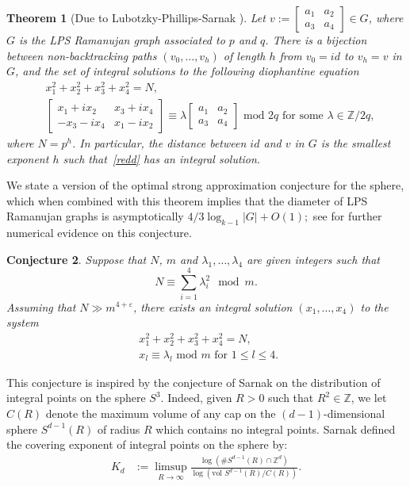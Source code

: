 \documentclass[11pt]{amsart}
\theoremstyle{plain}
\theoremstyle{plain}
\newtheorem{theorem}{Theorem}[section]
\newtheorem{conjecture}[theorem]{Conjecture}
\theoremstyle{remark}
\theoremstyle{definition}
\begin{document}
\begin{theorem}[Due to Lubotzky-Phillips-Sarnak \cite{Lubotzky1988}]\label{reductionthm} 
Let $v:=\begin{bmatrix} a_1 &a_2 \\ a_3 &a_4   \end{bmatrix} \in G$, where $G$ is the LPS Ramanujan graph associated to $p$ and $q$. There is a bijection between  non-backtracking  paths $(v_0,\dots,v_h)$  of length $h$ from $v_0=id$ to $v_h=v$  in $G$, and the set of integral solutions to the following diophantine equation 
\begin{equation}\label{redd}
\begin{split}
&x_1^2+x_2^2+x_3^2+x_4^2=N,
\\
&\begin{bmatrix}x_1+ix_2 & x_3+ix_4 \\ -x_3-ix_4 &x_1-ix_2 \end{bmatrix}  \equiv  \lambda \begin{bmatrix} a_1 &a_2 \\ a_3 &a_4   \end{bmatrix}  \text{ mod } 2q \text{ for some }\lambda \in \mathbb{Z}/2q,
\end{split}
\end{equation} 
   where $N=p^h$.
In particular, the distance between $id$ and $v$ in $G$ is the smallest exponent $h$ such that~\eqref{redd} has an integral solution. 
\end{theorem}
We state a version of the optimal strong approximation conjecture for the sphere, which when combined with this theorem implies that the diameter of LPS Ramanujan graphs is asymptotically $4/3 \log_{k-1}|G|+O(1);$ see \cite{Cayley, Complexity} for further numerical evidence on this conjecture.
\begin{conjecture}\label{mainconjecture}
Suppose that $N$, $m$ and $\lambda_1, \dots, \lambda_4$ are given integers such that 
$$
N\equiv \sum_{i=1}^4 \lambda_i^2 \mod m.
$$ 
Assuming that $N\gg m^{4+\varepsilon}$, there exists an integral solution $(x_1,\dots,x_4)$ to the system
\begin{equation*}\label{redd}
\begin{split}
&x_1^2+x_2^2+x_3^2+x_4^2=N,
\\
&x_l\equiv \lambda_l \text{ mod } m \text{ for  $1\leq l \leq 4$. }
\end{split}
\end{equation*} 
\end{conjecture}
 This conjecture is inspired by the conjecture of Sarnak on the distribution of integral points on the sphere $S^3$. Indeed, given $R>0$ such that $R^2\in \mathbb{Z}$, we let $C(R)$ denote the maximum volume  of any cap on  the $(d-1)$-dimensional sphere $S^{d-1}(R)$ of radius $R$ which contains no integral points. Sarnak defined  \cite{Sarnak2}
 the covering exponent of integral points on the sphere by:
 \begin{equation*}
 \begin{split}
 K_d&:=\limsup_{R \to \infty}\frac{\log \left(\# S^{d-1}(R)\cap \mathbb{Z}^d \right) }{\log\left( \text{vol } S^{d-1}(R)/C(R)\right)}.
 \end{split}
 \end{equation*}
 
\end{document}
